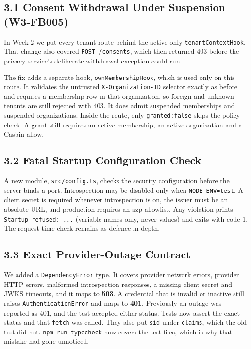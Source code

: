 \documentclass{article}
\begin{document}
\subsection*{3.1 Consent Withdrawal Under Suspension (W3-FB005)}
In Week 2 we put every tenant route behind the active-only \texttt{tenantContextHook}. That change also covered \texttt{POST /consents}, which then returned 403 before the privacy service's deliberate withdrawal exception could run.

The fix adds a separate hook, \texttt{ownMembershipHook}, which is used only on this route. It validates the untrusted \texttt{X-Organization-ID} selector exactly as before and requires a membership row in that organization, so foreign and unknown tenants are still rejected with 403. It does admit suspended memberships and suspended organizations. Inside the route, only \texttt{granted:false} skips the policy check. A grant still requires an active membership, an active organization and a Casbin allow.

\subsection*{3.2 Fatal Startup Configuration Check}
A new module, \texttt{src/config.ts}, checks the security configuration before the server binds a port. Introspection may be disabled only when \texttt{NODE\_ENV=test}. A client secret is required whenever introspection is on, the issuer must be an absolute URL, and production requires an azp allowlist. Any violation prints \texttt{Startup refused: ...} (variable names only, never values) and exits with code 1. The request-time check remains as defence in depth.

\subsection*{3.3 Exact Provider-Outage Contract}
We added a \texttt{DependencyError} type. It covers provider network errors, provider HTTP errors, malformed introspection responses, a missing client secret and JWKS timeouts, and it maps to \textbf{503}. A credential that is invalid or inactive still raises \texttt{AuthenticationError} and maps to \textbf{401}. Previously an outage was reported as 401, and the test accepted either status. Tests now assert the exact status and that \texttt{fetch} was called. They also put \texttt{sid} under \texttt{claims}, which the old test did not. \texttt{npm run typecheck} now covers the test files, which is why that mistake had gone unnoticed.
\end{document}

